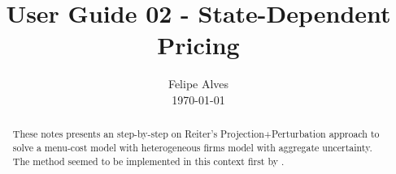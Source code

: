 \documentclass[a4paper,10pt]{article}  %
\title{User Guide 02 - State-Dependent Pricing \vspace{-1.25em}} %
\author{
        \normalfont\large Felipe Alves \\[-2.5pt]       \normalsize
        \today
}
\date{ \vspace{-3em} }
\begin{document}
\maketitle
\begin{abstract}
   These notes presents an step-by-step on Reiter’s Projection+Perturbation approach to solve a menu-cost model with heterogeneous
   firms model with aggregate uncertainty. The method seemed to be implemented in this context first by \citet{reiterstudent}.
\end{abstract}

\citet{carroll}
\clearpage
\newpage
% 
% 


\end{document}
